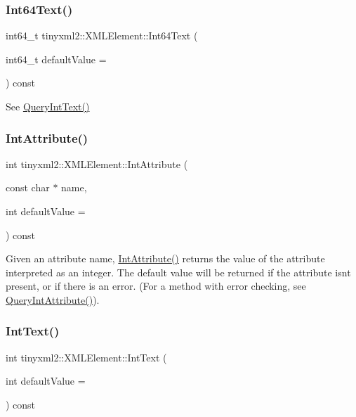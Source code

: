 \subsubsection{\texorpdfstring{Int64\+Text()}{Int64Text()}}
{\footnotesize\ttfamily int64\+\_\+t tinyxml2\+::\+X\+M\+L\+Element\+::\+Int64\+Text (\begin{DoxyParamCaption}\item[{int64\+\_\+t}]{default\+Value = {} }\end{DoxyParamCaption}) const}



See \mbox{\hyperlink{classtinyxml2_1_1_x_m_l_element_a926357996bef633cb736e1a558419632}{Query\+Int\+Text()}} 

\mbox{\label{classtinyxml2_1_1_x_m_l_element_a95a89b13bb14a2d4655e2b5b406c00d4}} 
\subsubsection{\texorpdfstring{Int\+Attribute()}{IntAttribute()}}
{\footnotesize\ttfamily int tinyxml2\+::\+X\+M\+L\+Element\+::\+Int\+Attribute (\begin{DoxyParamCaption}\item[{const char $\ast$}]{name,  }\item[{int}]{default\+Value = {} }\end{DoxyParamCaption}) const}

Given an attribute name, \mbox{\hyperlink{classtinyxml2_1_1_x_m_l_element_a95a89b13bb14a2d4655e2b5b406c00d4}{Int\+Attribute()}} returns the value of the attribute interpreted as an integer. The default value will be returned if the attribute isn\textquotesingle{}t present, or if there is an error. (For a method with error checking, see \mbox{\hyperlink{classtinyxml2_1_1_x_m_l_element_a8a78bc1187c1c45ad89f2690eab567b1}{Query\+Int\+Attribute()}}). \mbox{\label{classtinyxml2_1_1_x_m_l_element_a37b0636adebb8a1a1bc965f60824cb3e}} 
\subsubsection{\texorpdfstring{Int\+Text()}{IntText()}}
{\footnotesize\ttfamily int tinyxml2\+::\+X\+M\+L\+Element\+::\+Int\+Text (\begin{DoxyParamCaption}\item[{int}]{default\+Value = {} }\end{DoxyParamCaption}) const}

